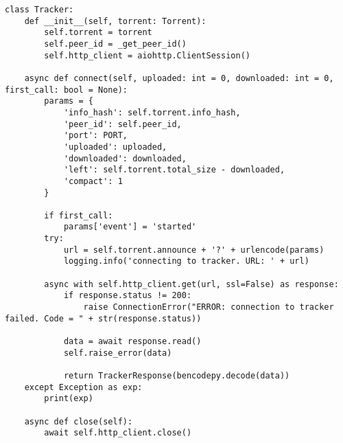 \begin{lstlisting}[caption = {Класс Tracker}]
class Tracker:
	def __init__(self, torrent: Torrent):
		self.torrent = torrent
		self.peer_id = _get_peer_id()
		self.http_client = aiohttp.ClientSession()
	
	async def connect(self, uploaded: int = 0, downloaded: int = 0, first_call: bool = None):
		params = {
			'info_hash': self.torrent.info_hash,
			'peer_id': self.peer_id,
			'port': PORT,
			'uploaded': uploaded,
			'downloaded': downloaded,
			'left': self.torrent.total_size - downloaded,
			'compact': 1
		}
		
		if first_call:
			params['event'] = 'started'
		try:
			url = self.torrent.announce + '?' + urlencode(params)
			logging.info('connecting to tracker. URL: ' + url)
	
		async with self.http_client.get(url, ssl=False) as response:
			if response.status != 200:
				raise ConnectionError("ERROR: connection to tracker failed. Code = " + str(response.status))
	
			data = await response.read()
			self.raise_error(data)
	
			return TrackerResponse(bencodepy.decode(data))
	except Exception as exp:
		print(exp)
	
	async def close(self):
		await self.http_client.close()
\end{lstlisting}

	
	
